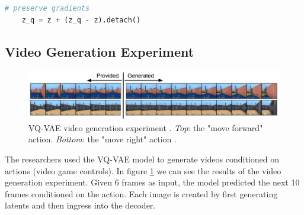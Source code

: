 \begin{lstlisting}[language=Python, label=lst:vqvae_stop_gradients, caption=Allow gradients to flow through the snapping operation.]
    # preserve gradients
    z_q = z + (z_q - z).detach()
\end{lstlisting}







\subsection{Video Generation Experiment}

\begin{figure}[h]
    \centering
    \includegraphics[width=\textwidth]{images/vqvae_video_generation.png}
    \caption{VQ-VAE video generation experiment \cite{vqvae}. \textit{Top}: the "move forward" action. \textit{Bottom}: the "move right" action \cite{vqvae}.}
    \label{fig:vqvae_video_generation}
\end{figure}

The researchers used the VQ-VAE model to generate videos conditioned on actions (video game controls). In figure \ref{fig:vqvae_video_generation} we can see the results of the video generation experiment. Given 6 frames as input, the model predicted the next 10 frames conditioned on the action. Each image is created by first generating latents and then ingress into the decoder.
